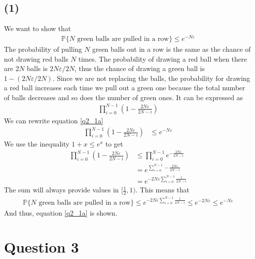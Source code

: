 \documentclass[a4paper]{article}
\begin{document}
\subsection*{(1)}
We want to show that
\begin{align}
\mathbb{P}\{\mbox{$N$ green balls are pulled in a row}\}\leq e^{-N\varepsilon}
\label{q2_1a}
\end{align}
The probability of pulling $N$ green balls out in a row is the same as the chance of not drawing red balls $N$ times. The probability of drawing a red ball when there are $2N$ balls is $2N\varepsilon/2N$, thus the chance of drawing a green ball is $1-(2N\varepsilon/2N)$. Since we are not replacing the balls, the probability for drawing a red ball increases each time we pull out a green one because the total number of balls decreases and so does the number of green ones. It can be expressed as
\begin{align*}
\prod_{i=0}^{N-1} \left(1-\frac{2N\varepsilon}{2N-i}\right)
\end{align*}
We can rewrite equation \ref{q2_1a}
\begin{align*}
\prod_{i=0}^{N-1} \left(1-\frac{2N\varepsilon}{2N-i}\right) &\leq e^{-N\varepsilon}
\end{align*}
We use the inequality $1+x\leq e^x$ to get
\begin{align*}
\prod_{i=0}^{N-1} \left(1-\frac{2N\varepsilon}{2N-i}\right) &\leq \prod_{i=0}^{N-1} e^{-\frac{2N\varepsilon}{2N-i}} \\
&= e^{\sum_{i=0}^{N-1}-\frac{2N\varepsilon}{2N-i}} \\
&= e^{-2N\varepsilon\sum_{i=0}^{N-1}\frac{1}{2N-i}}
\end{align*}
The sum will always provide values in $[\frac{1}{2}, 1)$. This means that
\begin{align*}
\mathbb{P}\{\mbox{$N$ green balls are pulled in a row}\}\leq e^{-2N\varepsilon\sum_{i=0}^{N-1}\frac{1}{2N-i}}\leq e^{-2N\varepsilon}\leq e^{-N\varepsilon}
\end{align*}
And thus, equation \ref{q2_1a} is shown.

\newpage
\section*{Question 3}
\end{document}

